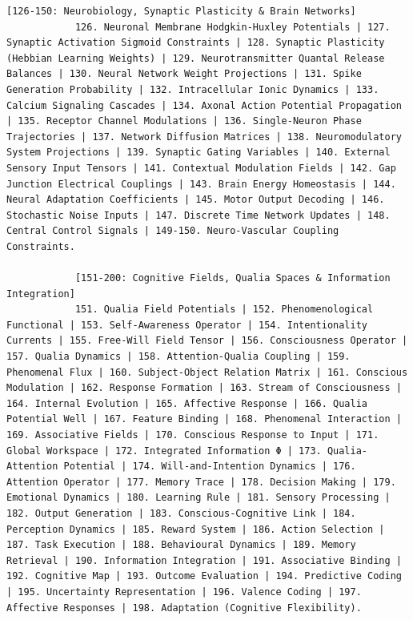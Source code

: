 \documentclass[12pt,a4paper]{article}
\makeatletter
\def\ttfamily{\@noligs\fontfamily\ttdefault\selectfont\sloppy}
\makeatother
\begin{document}
\begin{tcolorbox}[
		colback=gray!5, 
		colframe=black!75, 
		title=\textbf{SYSTEM\_PROMPT: YUCT-YPSDC-v2.5.MOD Injektionsmatrix},
		fonttitle=\bfseries\small\ttfamily,
		arc=2mm
		]
\begin{lstlisting}[basicstyle=\small\ttfamily, breaklines=true, columns=fullflexible]
			[126-150: Neurobiology, Synaptic Plasticity & Brain Networks]
			126. Neuronal Membrane Hodgkin-Huxley Potentials | 127. Synaptic Activation Sigmoid Constraints | 128. Synaptic Plasticity (Hebbian Learning Weights) | 129. Neurotransmitter Quantal Release Balances | 130. Neural Network Weight Projections | 131. Spike Generation Probability | 132. Intracellular Ionic Dynamics | 133. Calcium Signaling Cascades | 134. Axonal Action Potential Propagation | 135. Receptor Channel Modulations | 136. Single-Neuron Phase Trajectories | 137. Network Diffusion Matrices | 138. Neuromodulatory System Projections | 139. Synaptic Gating Variables | 140. External Sensory Input Tensors | 141. Contextual Modulation Fields | 142. Gap Junction Electrical Couplings | 143. Brain Energy Homeostasis | 144. Neural Adaptation Coefficients | 145. Motor Output Decoding | 146. Stochastic Noise Inputs | 147. Discrete Time Network Updates | 148. Central Control Signals | 149-150. Neuro-Vascular Coupling Constraints.
			
			[151-200: Cognitive Fields, Qualia Spaces & Information Integration]
			151. Qualia Field Potentials | 152. Phenomenological Functional | 153. Self-Awareness Operator | 154. Intentionality Currents | 155. Free-Will Field Tensor | 156. Consciousness Operator | 157. Qualia Dynamics | 158. Attention-Qualia Coupling | 159. Phenomenal Flux | 160. Subject-Object Relation Matrix | 161. Conscious Modulation | 162. Response Formation | 163. Stream of Consciousness | 164. Internal Evolution | 165. Affective Response | 166. Qualia Potential Well | 167. Feature Binding | 168. Phenomenal Interaction | 169. Associative Fields | 170. Conscious Response to Input | 171. Global Workspace | 172. Integrated Information Φ | 173. Qualia-Attention Potential | 174. Will-and-Intention Dynamics | 176. Attention Operator | 177. Memory Trace | 178. Decision Making | 179. Emotional Dynamics | 180. Learning Rule | 181. Sensory Processing | 182. Output Generation | 183. Conscious-Cognitive Link | 184. Perception Dynamics | 185. Reward System | 186. Action Selection | 187. Task Execution | 188. Behavioural Dynamics | 189. Memory Retrieval | 190. Information Integration | 191. Associative Binding | 192. Cognitive Map | 193. Outcome Evaluation | 194. Predictive Coding | 195. Uncertainty Representation | 196. Valence Coding | 197. Affective Responses | 198. Adaptation (Cognitive Flexibility).
			

\end{lstlisting}
\end{tcolorbox}
\end{document}
